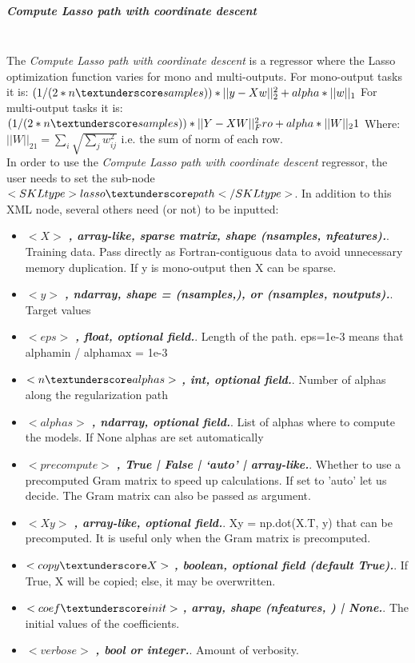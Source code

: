 \subparagraph{Compute Lasso path with coordinate descent}
\mbox{}
\\The \textit{Compute Lasso path with coordinate descent} is a regressor where the Lasso optimization function varies for mono and multi-outputs.
For mono-output tasks it is:
$(1 / (2 * n\textunderscore samples)) * ||y - Xw||^2_2 + alpha * ||w||_1$
For multi-output tasks it is:
$(1 / (2 * n\textunderscore samples)) * ||Y - XW||^2_Fro + alpha * ||W||_21$
Where:
$||W||_21 = \sum_i \sqrt{\sum_j w_{ij}^2}$
i.e. the sum of norm of each row.
\\In order to use the \textit{Compute Lasso path with coordinate descent} regressor, the user needs to set the sub-node $<SKLtype>lasso\textunderscore path</SKLtype>$.
In addition to this XML node, several others need (or not) to be inputted:
\begin{itemize}
  \item $<X>$ \textbf{\textit{, {array-like, sparse matrix}, shape (n\textunderscore samples, n\textunderscore features).}}. Training data. Pass directly as Fortran-contiguous data to avoid unnecessary memory duplication. If y is mono-output then X can be sparse.
  \item $<y>$ \textbf{\textit{, ndarray, shape = (n\textunderscore samples,), or (n\textunderscore samples, n\textunderscore outputs).}}. Target values
  \item $<eps>$ \textbf{\textit{, float, optional field.}}. Length of the path. eps=1e-3 means that alpha\textunderscore min / alpha\textunderscore max = 1e-3
  \item $<n\textunderscore alphas>$ \textbf{\textit{, int, optional field.}}. Number of alphas along the regularization path
  \item $<alphas>$ \textbf{\textit{, ndarray, optional field.}}. List of alphas where to compute the models. If None alphas are set automatically
  \item $<precompute>$ \textbf{\textit{, True | False | ‘auto’ | array-like.}}. Whether to use a precomputed Gram matrix to speed up calculations. If set to 'auto' let us decide. The Gram matrix can also be passed as argument.
  \item $<Xy>$ \textbf{\textit{, array-like, optional field.}}. Xy = np.dot(X.T, y) that can be precomputed. It is useful only when the Gram matrix is precomputed.
  \item $<copy\textunderscore X>$ \textbf{\textit{, boolean, optional field (default True).}}. If True, X will be copied; else, it may be overwritten.
  \item $<coef\textunderscore init>$ \textbf{\textit{, array, shape (n\textunderscore features, ) | None.}}. The initial values of the coefficients.
  \item $<verbose>$ \textbf{\textit{, bool or integer.}}. Amount of verbosity.
\end{itemize}

